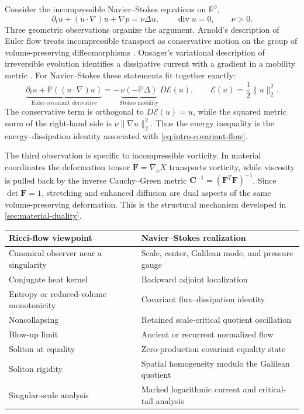 \documentclass[11pt]{amsart}
\numberwithin{equation}{section}
\theoremstyle{plain}
\theoremstyle{definition}
\theoremstyle{remark}
\newcommand{\R}{\mathbb R}
\newcommand{\Pdiv}{\mathbb P}
\newcommand{\diver}{\operatorname{div}}
\newcommand{\Energy}{\mathcal E}
\newcommand{\MaterialF}{\mathbf F}
\newcommand{\MaterialMetric}{\mathbf C}
\begin{document}
Consider the incompressible Navier--Stokes equations on \(\R^3\),
\begin{equation}\label{eq:NS}
  \partial_t u+(u\cdot\nabla)u+\nabla p=\nu\Delta u,
  \qquad \diver u=0,
  \qquad \nu>0.
\end{equation}
Three geometric observations organize the argument.  Arnold's
description of Euler flow treats incompressible transport as conservative
motion on the group of volume-preserving diffeomorphisms
\cite{Arnold1966,EbinMarsden1970}.  Onsager's variational description of
irreversible evolution identifies a dissipative current with a gradient in a
mobility metric \cite{Onsager1931}.  For Navier--Stokes these statements fit
together exactly:
\begin{equation}\label{eq:intro-covariant-flow}
  \underbrace{\partial_t u+\Pdiv((u\cdot\nabla)u)}_{
    \text{Euler-covariant derivative}}
  =-\underbrace{\nu(-\Pdiv\Delta)}_{
    \text{Stokes mobility}}\,D\Energy(u),
  \qquad
  \Energy(u)=\frac12\|u\|_2^2.
\end{equation}
The conservative term is orthogonal to \(D\Energy(u)=u\), while the squared
metric norm of the right-hand side is \(\nu\|\nabla u\|_2^2\).  Thus the
energy inequality is the energy--dissipation identity associated with
\eqref{eq:intro-covariant-flow}.

The third observation is specific to incompressible vorticity.  In material
coordinates the deformation tensor \(\MaterialF=\nabla_aX\) transports
vorticity, while viscosity is pulled back by the inverse Cauchy--Green metric
\(\MaterialMetric^{-1}=(\MaterialF^T\MaterialF)^{-1}\).  Since
\(\det\MaterialF=1\), stretching and enhanced diffusion are dual aspects of
the same volume-preserving deformation.  This is the structural mechanism
developed in \cref{sec:material-duality}.

\begin{center}
\small
\begin{tabular}{@{}L{0.42\textwidth}L{0.48\textwidth}@{}}
\toprule
Ricci-flow viewpoint & Navier--Stokes realization \\
\midrule
Canonical observer near a singularity & Scale, center, Galilean mode, and pressure gauge \\
Conjugate heat kernel & Backward adjoint localization \\
Entropy or reduced-volume monotonicity & Covariant flux--dissipation identity \\
Noncollapsing & Retained scale-critical quotient oscillation \\
Blow-up limit & Ancient or recurrent normalized flow \\
Soliton at equality & Zero-production covariant equality state \\
Soliton rigidity & Spatial homogeneity modulo the Galilean quotient \\
Singular-scale analysis & Marked logarithmic current and critical-tail analysis \\
\bottomrule
\end{tabular}
\end{center}
\end{document}

